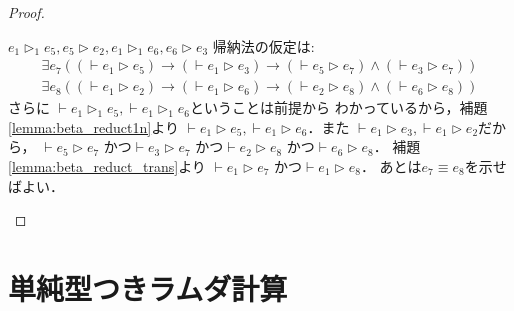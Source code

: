 \documentclass{ltjsbook}%
\newcommand\lemmaname{補題}%
\begin{document}
\begin{proof}
\begin{itemize}
    $\mathit{e}_1\triangleright_1\mathit{e}_5,%
    \mathit{e}_5\triangleright\mathit{e}_2,%
    \mathit{e}_1\triangleright_1\mathit{e}_6,%
    \mathit{e}_6\triangleright\mathit{e}_3$%
    帰納法の仮定は:%
    \begin{align}%
      \exists\mathit{e}_7%
      ((\vdash\mathit{e}_1\triangleright\mathit{e}_5)\rightarrow%
      (\vdash\mathit{e}_1\triangleright\mathit{e}_3)\rightarrow%
      (\vdash\mathit{e}_5\triangleright\mathit{e}_7)\land%
      (\vdash\mathit{e}_3\triangleright\mathit{e}_7))\\%
      \exists\mathit{e}_8%
      ((\vdash\mathit{e}_1\triangleright\mathit{e}_2)\rightarrow%
      (\vdash\mathit{e}_1\triangleright\mathit{e}_6)\rightarrow%
      (\vdash\mathit{e}_2\triangleright\mathit{e}_8)\land%
      (\vdash\mathit{e}_6\triangleright\mathit{e}_8))%
  \end{align}%
  さらに%
  $\vdash\mathit{e}_1\triangleright_1\mathit{e}_5,%
  \vdash\mathit{e}_1\triangleright_1\mathit{e}_6$ということは前提から%
  わかっているから，\lemmaname\ref{lemma:beta_reduct1n}より%
  $\vdash\mathit{e}_1\triangleright\mathit{e}_5,%
  \vdash\mathit{e}_1\triangleright\mathit{e}_6$．また%
  $\vdash\mathit{e}_1\triangleright\mathit{e}_3,%
  \vdash\mathit{e}_1\triangleright\mathit{e}_2$だから，%
  $\vdash\mathit{e}_5\triangleright\mathit{e}_7$%
  かつ$\vdash\mathit{e}_3\triangleright\mathit{e}_7$%
  かつ$\vdash\mathit{e}_2\triangleright\mathit{e}_8$%
  かつ$\vdash\mathit{e}_6\triangleright\mathit{e}_8$．%
  \lemmaname\ref{lemma:beta_reduct_trans}より%
  $\vdash\mathit{e}_1\triangleright\mathit{e}_7$%
  かつ$\vdash\mathit{e}_1\triangleright\mathit{e}_8$．%
  あとは$\mathit{e}_7\equiv\mathit{e}_8$を示せばよい．%
  \end{itemize}%
\end{proof}%
\fi%
\chapter{単純型つきラムダ計算}%
\label{chap:typed}%
\end{document}
